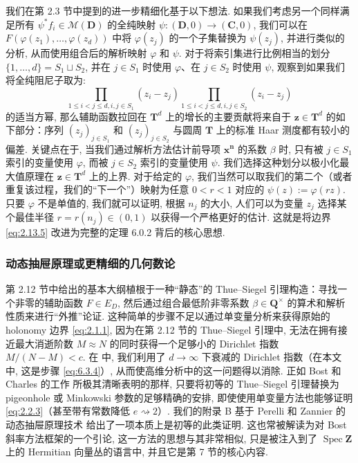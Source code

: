 我们在第 2.3 节中提到的进一步精细化基于以下想法. 如果我们考虑另一个同样满足所有 \(\psi^*f_i \in \mathcal{M}(\mathbf{D})\) 的全纯映射 \(\psi: (\mathbf{D}, 0) \to (\mathbf{C}, 0)\), 我们可以在 \(F(\varphi(z_1), \dots, \varphi(z_d))\) 中将 \(\varphi(z_j)\) 的一个子集替换为 \(\psi(z_j)\), 并进行类似的分析, 从而使用组合后的解析映射 \(\varphi\) 和 \(\psi\). 对于将索引集进行比例相当的划分 \(\{1, \dots, d\} = S_1 \sqcup S_2\), 并在 \(j \in S_1\) 时使用 \(\varphi\)、在 \(j \in S_2\) 时使用 \(\psi\), 观察到如果我们将全纯阻尼子取为:
\[ \prod_{1 \le i < j \le d, i, j \in S_1} (z_i - z_j) \prod_{1 \le i < j \le d, i, j \in S_2} (z_i - z_j) \]
的适当方幂, 那么辅助函数拉回在 \(\mathbf{T}^d\) 上的增长的主要贡献将来自于 \(\mathbf{z} \in \mathbf{T}^d\) 的如下部分：序列 \((z_j)_{j \in S_1}\) 和 \((z_j)_{j \in S_2}\) 与圆周 \(\mathbf{T}\) 上的标准 Haar 测度都有较小的偏差. 关键点在于, 当我们通过解析方法估计前导项 \(\mathbf{x}^{\mathbf{n}}\) 的系数 \(\beta\) 时, 只有被 \(j \in S_1\) 索引的变量使用 \(\varphi\), 而被 \(j \in S_2\) 索引的变量使用 \(\psi\). 我们选择这种划分以极小化最大值原理在 \(\mathbf{z} \in \mathbf{T}^d\) 上的上界. 对于给定的 \(\varphi\), 我们当然可以取我们的第二个（或者重复该过程，我们的“下一个”）映射为任意 \(0 < r < 1\) 对应的 \(\psi(z) := \varphi(rz)\). 只要 \(\varphi\) 不是单值的, 我们就可以证明, 根据 \(n_j\) 的大小, 人们可以为变量 \(z_j\) 选择某个最佳半径 \(r = r(n_j) \in (0,1)\) 以获得一个严格更好的估计. 这就是将边界 \eqref{eq:2.13.5} 改进为完整的定理 6.0.2 背后的核心思想.

\subsubsection{动态抽屉原理或更精细的几何数论}\label{sec:2.13.11}

第 2.12 节中给出的基本大纲植根于一种“静态”的 Thue--Siegel 引理构造：寻找一个非零的辅助函数 \(F \in E_D\), 然后通过组合最低阶非零系数 \(\beta \in \mathbf{Q}^{\times}\) 的算术和解析性质来进行“外推”论证. 这种简单的步骤不足以通过单变量分析来获得原始的 holonomy 边界 \eqref{eq:2.1.1}, 因为在第 2.12 节的 Thue--Siegel 引理中, 无法在拥有接近最大消逝阶数 \(M \approx N\) 的同时获得一个足够小的 Dirichlet 指数 \(M/(N-M) < c\). 在 \cite[§ 2]{CDT21} 中, 我们利用了 \(d \to \infty\) 下衰减的 Dirichlet 指数（在本文中, 这是步骤 \eqref{eq:6.3.4}）, 从而使高维分析中的这一问题得以消除. 
正如 Bost 和 Charles 的工作 \cite{BC22} 所极其清晰表明的那样, 只要将初等的 Thue--Siegel 引理替换为 pigeonhole 或 Minkowski 参数的足够精确的安排, 即使使用单变量方法也能够证明 \eqref{eq:2.2.3}（甚至带有常数降低 \(e \rightsquigarrow 2\)）.
我们的附录 B 基于 Perelli 和 Zannier 的动态抽屉原理技术 \cite[§ 2 Lemma 1]{PZ84} 给出了一项本质上是初等的此类证明.
这也常被解读为对 Bost 斜率方法框架的一个引论, 这一方法的思想与其非常相似, 只是被注入到了 \(\operatorname{Spec} \mathbf{Z}\) 上的 Hermitian 向量丛的语言中, 并且它是第 7 节的核心内容.

